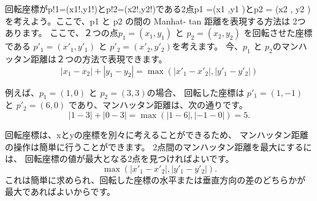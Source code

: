 回転座標がp!1=(x1!,y1!)とp!2=(x2!,y2!)である2点p1 =(x1 ,y1 )とp2 = (x2 , y2 ) を考えよう。ここで、p1 と p2 の間の Manhat- tan 距離を表現する方法は
2つあります。
ここで、２つの点$p_1=(x_1,y_1)$ と $p_2=(x_2,y_2)$ を回転させた座標である
$p'_1=(x'_1,y'_1)$ と
$p'_2=(x'_2,y'_2)$を考えます。
今、$p_1$ と $p_2$のマンハッタン距離は２つの方法で表現できます。
\[|x_1-x_2|+|y_1-y_2| = \max(|x'_1-x'_2|,|y'_1-y'_2|)\]

例えば、$p_1=(1,0)$ と $p_2=(3,3)$の場合、
回転した座標は $p'_1=(1,-1)$ と $p'_2=(6,0)$
であり、マンハッタン距離は、次の通りです。
\[|1-3|+|0-3| = \max(|1-6|,|-1-0|) = 5.\]

回転座標は、xとyの座標を別々に考えることができるため、
マンハッタン距離の操作は簡単に行うことができます。
2点間のマンハッタン距離を最大にするには、
回転座標の値が最大となる2点を見つければよいです。
\[\max(|x'_1-x'_2|,|y'_1-y'_2|).\]
これは簡単に求められ、回転した座標の水平または垂直方向の差のどちらかが最大であればよいからです。